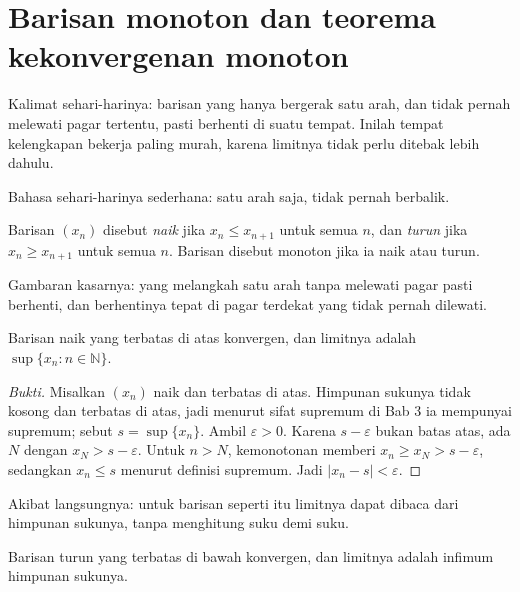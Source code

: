 \section{Barisan monoton dan teorema kekonvergenan monoton}

Kalimat sehari-harinya: barisan yang hanya bergerak satu arah, dan tidak pernah
melewati pagar tertentu, pasti berhenti di suatu tempat. Inilah tempat kelengkapan
bekerja paling murah, karena limitnya tidak perlu ditebak lebih dahulu.


Bahasa sehari-harinya sederhana: satu arah saja, tidak pernah berbalik.

\begin{definisi}
Barisan $(x_n)$ disebut \emph{naik} jika $x_n \le x_{n+1}$
untuk semua $n$, dan \emph{turun} jika $x_n \ge x_{n+1}$ untuk semua $n$.
Barisan disebut monoton jika ia naik atau turun.
\end{definisi}

Gambaran kasarnya: yang melangkah satu arah tanpa melewati pagar pasti berhenti, dan
berhentinya tepat di pagar terdekat yang tidak pernah dilewati.

\begin{teorema}
Barisan naik yang terbatas di atas konvergen, dan limitnya adalah
$\sup\{x_n : n \in \mathbb{N}\}$.
\end{teorema}

\begin{proof}[Bukti]
Misalkan $(x_n)$ naik dan terbatas di atas. Himpunan sukunya tidak kosong dan
terbatas di atas, jadi menurut sifat supremum di Bab 3 ia mempunyai supremum;
sebut $s=\sup\{x_n\}$. Ambil $\varepsilon>0$. Karena $s-\varepsilon$ bukan batas
atas, ada $N$ dengan $x_N>s-\varepsilon$. Untuk $n>N$, kemonotonan memberi
$x_n \ge x_N>s-\varepsilon$, sedangkan $x_n \le s$ menurut definisi supremum. Jadi
$|x_n-s|<\varepsilon$.
\end{proof}

Akibat langsungnya: untuk barisan seperti itu limitnya dapat dibaca dari himpunan
sukunya, tanpa menghitung suku demi suku.

\begin{akibat}
Barisan turun yang terbatas di bawah konvergen, dan limitnya adalah infimum
himpunan sukunya.
\end{akibat}

